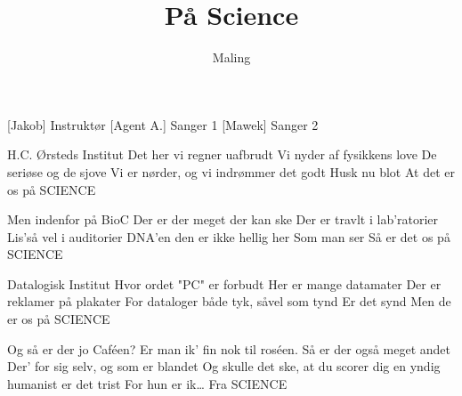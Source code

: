 \documentclass[a4paper,11pt]{article}
\title{På Science}
\author{Maling}
\begin{document}
\maketitle

\begin{roles}
[Jakob] Instruktør
[Agent A.] Sanger 1
[Mawek] Sanger 2
\end{roles}

\begin{song}

 H.C. Ørsteds Institut 
Det her vi regner uafbrudt 
Vi nyder af fysikkens love 
De seriøse og de sjove 
Vi er nørder, 
og vi indrømmer det godt 
Husk nu blot 
At det er os på SCIENCE

Men indenfor på BioC 
Der er der meget der kan ske 
Der er travlt i lab’ratorier 
Lis’så vel i auditorier 
DNA’en den er ikke hellig her 
Som man ser 
Så er det os på SCIENCE

Datalogisk Institut 
Hvor ordet "PC" er forbudt 
Her er mange datamater 
Der er reklamer på plakater 
For dataloger både tyk, såvel som tynd 
Er det synd 
Men de er os på SCIENCE

Og så er der jo Caféen? 
Er man ik’ fin nok til roséen.
Så er der også meget andet 
Der’ for sig selv, og som er blandet 
Og skulle det ske, at du scorer dig en yndig humanist
er det trist 
For hun er ik… Fra SCIENCE 

\end{song}
\end{document}
